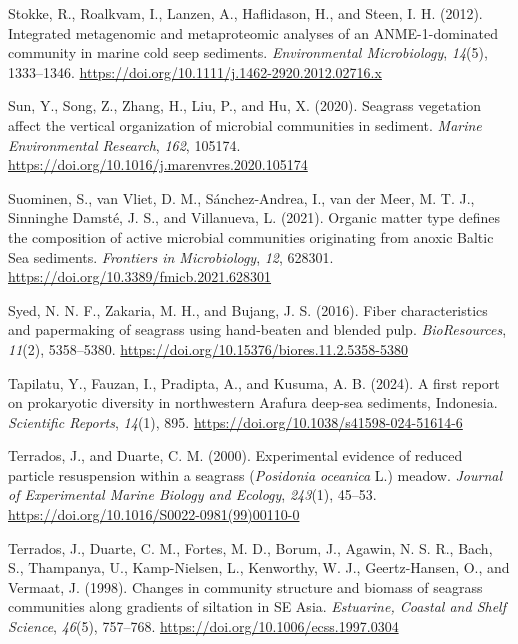 \documentclass[
  12 pt,
]{book}
\newlength{\cslhangindent}
\newlength{\cslentryspacingunit} %
\newenvironment{CSLReferences}[2] %
 {%
  \setlength{\parindent}{0pt}
  \ifodd #1
  \let\oldpar\par
  \def\par{\hangindent=\cslhangindent\oldpar}
  \fi
  \setlength{\parskip}{#2\cslentryspacingunit}
 }%
 {}
\begin{document}
\begin{CSLReferences}{1}{0}
\leavevmode{}%
Stokke, R., Roalkvam, I., Lanzen, A., Haflidason, H., and Steen, I. H. (2012). Integrated metagenomic and metaproteomic analyses of an {ANME-1-dominated} community in marine cold seep sediments. \emph{Environmental Microbiology}, \emph{14}(5), 1333--1346. \url{https://doi.org/10.1111/j.1462-2920.2012.02716.x}

\leavevmode{}%
Sun, Y., Song, Z., Zhang, H., Liu, P., and Hu, X. (2020). Seagrass vegetation affect the vertical organization of microbial communities in sediment. \emph{Marine Environmental Research}, \emph{162}, 105174. \url{https://doi.org/10.1016/j.marenvres.2020.105174}

\leavevmode{}%
Suominen, S., van Vliet, D. M., Sánchez-Andrea, I., van der Meer, M. T. J., Sinninghe Damsté, J. S., and Villanueva, L. (2021). Organic matter type defines the composition of active microbial communities originating from anoxic {Baltic Sea} sediments. \emph{Frontiers in Microbiology}, \emph{12}, 628301. \url{https://doi.org/10.3389/fmicb.2021.628301}

\leavevmode{}%
Syed, N. N. F., Zakaria, M. H., and Bujang, J. S. (2016). Fiber characteristics and papermaking of seagrass using hand-beaten and blended pulp. \emph{BioResources}, \emph{11}(2), 5358--5380. \url{https://doi.org/10.15376/biores.11.2.5358-5380}

\leavevmode{}%
Tapilatu, Y., Fauzan, I., Pradipta, A., and Kusuma, A. B. (2024). A first report on prokaryotic diversity in northwestern {Arafura} deep-sea sediments, {Indonesia}. \emph{Scientific Reports}, \emph{14}(1), 895. \url{https://doi.org/10.1038/s41598-024-51614-6}

\leavevmode{}%
Terrados, J., and Duarte, C. M. (2000). Experimental evidence of reduced particle resuspension within a seagrass ({{\emph{Posidonia oceanica}}} {L}.) meadow. \emph{Journal of Experimental Marine Biology and Ecology}, \emph{243}(1), 45--53. \url{https://doi.org/10.1016/S0022-0981(99)00110-0}

\leavevmode{}%
Terrados, J., Duarte, C. M., Fortes, M. D., Borum, J., Agawin, N. S. R., Bach, S., Thampanya, U., Kamp-Nielsen, L., Kenworthy, W. J., Geertz-Hansen, O., and Vermaat, J. (1998). Changes in community structure and biomass of seagrass communities along gradients of siltation in {SE Asia}. \emph{Estuarine, Coastal and Shelf Science}, \emph{46}(5), 757--768. \url{https://doi.org/10.1006/ecss.1997.0304}


\end{CSLReferences}
\end{document}
